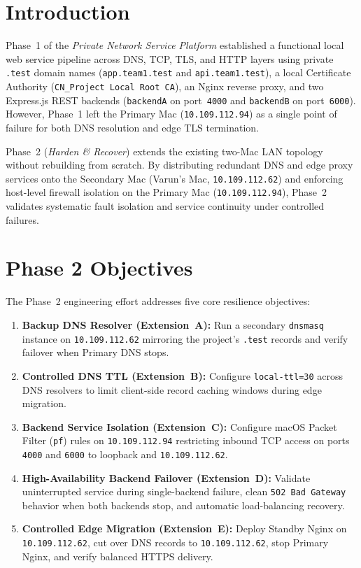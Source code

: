 \documentclass[conference]{IEEEtran}
\begin{document}
\section{Introduction}
Phase~1 of the \textit{Private Network Service Platform} established a functional local web service pipeline across DNS, TCP, TLS, and HTTP layers using private \texttt{.test} domain names (\texttt{app.team1.test} and \texttt{api.team1.test}), a local Certificate Authority (\texttt{CN\_Project Local Root CA}), an Nginx reverse proxy, and two Express.js REST backends (\texttt{backendA} on port~\texttt{4000} and \texttt{backendB} on port~\texttt{6000}). However, Phase~1 left the Primary Mac (\texttt{10.109.112.94}) as a single point of failure for both DNS resolution and edge TLS termination.

Phase~2 (\textit{Harden \& Recover}) extends the existing two-Mac LAN topology without rebuilding from scratch. By distributing redundant DNS and edge proxy services onto the Secondary Mac (Varun's Mac, \texttt{10.109.112.62}) and enforcing host-level firewall isolation on the Primary Mac (\texttt{10.109.112.94}), Phase~2 validates systematic fault isolation and service continuity under controlled failures.

\section{Phase 2 Objectives}
The Phase~2 engineering effort addresses five core resilience objectives:
\begin{enumerate}
    \item \textbf{Backup DNS Resolver (Extension~A):} Run a secondary \texttt{dnsmasq} instance on \texttt{10.109.112.62} mirroring the project's \texttt{.test} records and verify failover when Primary DNS stops.
    \item \textbf{Controlled DNS TTL (Extension~B):} Configure \texttt{local-ttl=30} across DNS resolvers to limit client-side record caching windows during edge migration.
    \item \textbf{Backend Service Isolation (Extension~C):} Configure macOS Packet Filter (\texttt{pf}) rules on \texttt{10.109.112.94} restricting inbound TCP access on ports \texttt{4000} and \texttt{6000} to loopback and \texttt{10.109.112.62}.
    \item \textbf{High-Availability Backend Failover (Extension~D):} Validate uninterrupted service during single-backend failure, clean \texttt{502 Bad Gateway} behavior when both backends stop, and automatic load-balancing recovery.
    \item \textbf{Controlled Edge Migration (Extension~E):} Deploy Standby Nginx on \texttt{10.109.112.62}, cut over DNS records to \texttt{10.109.112.62}, stop Primary Nginx, and verify balanced HTTPS delivery.
\end{enumerate}
\end{document}
